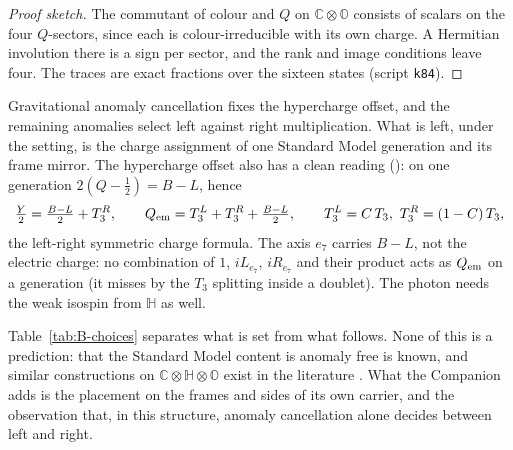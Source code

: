 \begin{proof}[Proof sketch]
The commutant of colour and $Q$ on $\mathbb C\otimes\mathbb O$ consists of scalars on the four $Q$-sectors, since each is
colour-irreducible with its own charge. A Hermitian involution there is a sign per sector, and the rank and image conditions
leave four. The traces are exact fractions over the sixteen states (script \texttt{k84}).
\end{proof}

Gravitational anomaly cancellation fixes the hypercharge offset, and the remaining anomalies select left against right
multiplication. What is left, under the setting, is the charge assignment of one Standard Model generation and its frame
mirror. The hypercharge offset also has a clean reading
(): on one generation $2(Q-\tfrac12)=B-L$, hence
\begin{equation}
 \tfrac Y2=\tfrac{B-L}{2}+T_3^R,\qquad Q_{\rm em}=T_3^L+T_3^R+\tfrac{B-L}{2},\qquad T_3^L=C\,T_3,\ T_3^R=(1-C)\,T_3 ,
 \label{eq:B-BL}
\end{equation}
the left-right symmetric charge formula. The axis $e_7$ carries $B-L$, not the electric charge: no combination of
$1$, $iL_{e_7}$, $iR_{e_7}$ and their product acts as $Q_{\rm em}$ on a generation (it misses by the $T_3$ splitting inside a
doublet). The photon needs the weak isospin from $\mathbb H$ as well.

Table~\ref{tab:B-choices} separates what is set from what follows. None of this is a prediction: that the Standard Model
content is anomaly free is known, and similar constructions on $\mathbb C\otimes\mathbb H\otimes\mathbb O$ exist in the
literature \cite{Dixon1994,Furey2015}. What the Companion adds is the placement on the frames and sides of its own carrier,
and the observation that, in this structure, anomaly cancellation alone decides between left and right.

